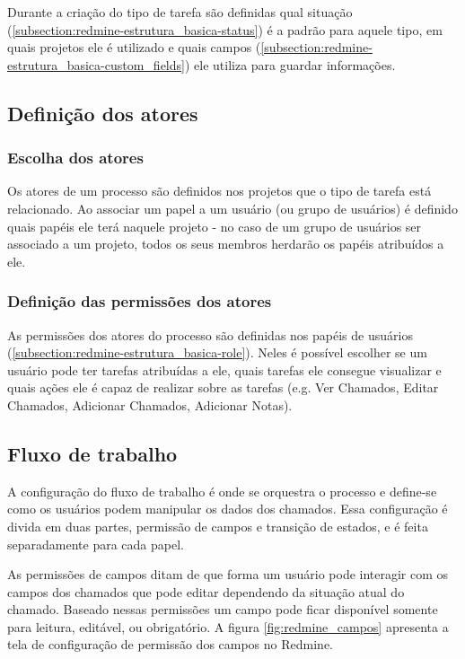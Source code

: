 Durante a criação do tipo de tarefa são definidas qual situação (\ref{subsection:redmine-estrutura_basica-status}) é a padrão para aquele tipo, em quais projetos ele é utilizado e quais campos (\ref{subsection:redmine-estrutura_basica-custom_fields}) ele utiliza para guardar informações.


\subsection{Definição dos atores}\label{subsection:redmine-automatizar_processo-atores}

\subsubsection{Escolha dos atores}

Os atores de um processo são definidos nos projetos que o tipo de tarefa está relacionado. Ao associar um papel a um usuário (ou grupo de usuários) é definido quais papéis ele terá naquele projeto - no caso de um grupo de usuários ser associado a um projeto, todos os seus membros herdarão os papéis atribuídos a ele.

\subsubsection{Definição das permissões dos atores}

As permissões dos atores do processo são definidas nos papéis de usuários (\ref{subsection:redmine-estrutura_basica-role}). Neles é possível escolher se um usuário pode ter tarefas atribuídas a ele, quais tarefas ele consegue visualizar e quais ações ele é capaz de realizar sobre as tarefas (e.g. Ver Chamados, Editar Chamados, Adicionar Chamados, Adicionar Notas).

\subsection{Fluxo de trabalho}

A configuração do fluxo de trabalho é onde se orquestra o processo e define-se como os usuários podem manipular os dados dos chamados. Essa configuração é divida em duas partes, permissão de campos e transição de estados, e é feita separadamente para cada papel.

As permissões de campos ditam de que forma um usuário pode interagir com os campos dos chamados que pode editar dependendo da situação atual do chamado. Baseado nessas permissões um campo pode ficar disponível somente para leitura, editável, ou obrigatório. A figura \ref{fig:redmine_campos} apresenta a tela de configuração de permissão dos campos no Redmine.

